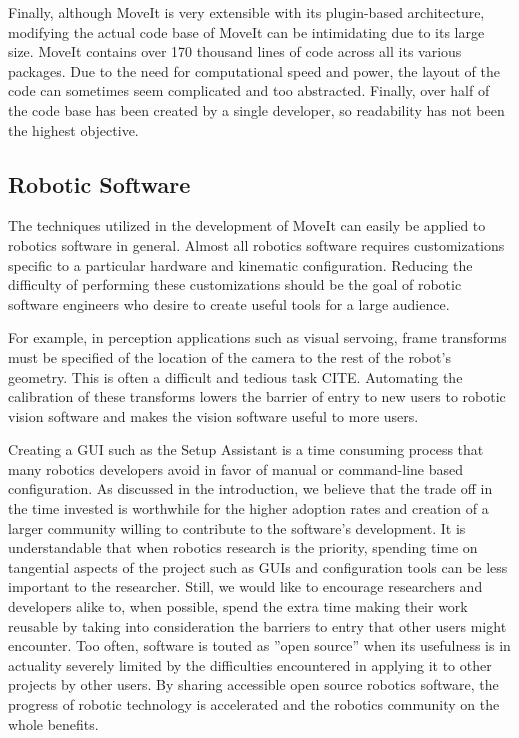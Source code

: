 \documentclass[10pt,journal,compsoc]{joser1}
\begin{document}
{Finally, although MoveIt is very extensible with its plugin-based architecture, modifying the actual code base of MoveIt can be intimidating due to its large size. MoveIt contains over 170 thousand lines of code across all its various packages. Due to the need for computational speed and power, the layout of the code can sometimes seem complicated and too abstracted. Finally, over half of the code base has been created by a single developer, so readability has not been the highest objective. 

\subsection{Robotic Software}
\label{sec::robotic_discussion}

The techniques utilized in the development of MoveIt can easily be applied to robotics software in general. Almost all robotics software requires customizations specific to a particular hardware and kinematic configuration. Reducing the difficulty of performing these customizations should be the goal of robotic software engineers who desire to create useful tools for a large audience. 

For example, in perception applications such as visual servoing, frame transforms must be specified of the location of the camera to the rest of the robot's geometry. This is often a difficult and tedious task CITE. Automating the calibration of these transforms lowers the barrier of entry to new users to robotic vision software and makes the vision software useful to more users.

Creating a GUI such as the Setup Assistant is a time consuming process that many robotics developers avoid in favor of manual or command-line based configuration. As discussed in the introduction, we believe that the trade off in the time invested is worthwhile for the higher adoption rates and creation of a larger community willing to contribute to the software's development. It is understandable that when robotics research is the priority, spending time on tangential aspects of the project such as GUIs and configuration tools can be less important to the researcher. Still, we would like to encourage researchers and developers alike to, when possible, spend the extra time making their work reusable by taking into consideration the barriers to entry that other users might encounter. Too often, software is touted as ''open source'' when its usefulness is in actuality severely limited by the difficulties encountered in applying it to other projects by other users. By sharing accessible open source robotics 
software, the progress of robotic technology is accelerated and the robotics community on the whole benefits.

}
\end{document}
